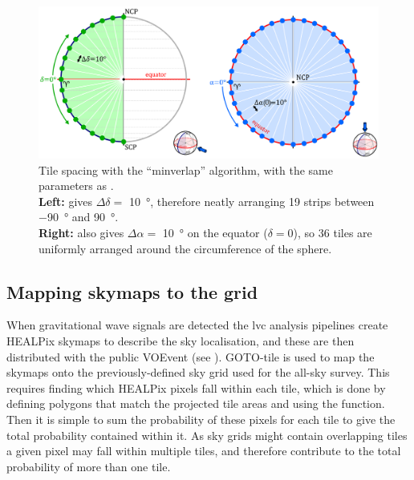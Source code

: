 \begin{colsection}
\begin{colsection}
\begin{figure}[p]
    \begin{center}
        \includegraphics[width=\linewidth]{images/spacing_minverlap.pdf}
    \end{center}
    \caption[Tile spacing with the ``minverlap'' algorithm]{
        Tile spacing with the ``minverlap'' algorithm, with the same parameters as .
        \\
        \textbf{Left:}  gives $\Delta\delta = $ \SI{10}{\degree}, therefore neatly arranging 19 strips    between \SI{-90}{\degree} and \SI{90}{\degree}.
        \\
        \textbf{Right:}  also gives $\Delta\alpha = $ \SI{10}{\degree} on the equator ($\delta=0$), so 36 tiles are uniformly arranged around the circumference of the sphere.
    }\label{fig:minverlap_spacing}
\end{figure}

\clearpage

\end{colsection}


\subsection{Mapping skymaps to the grid}
\label{sec:mapping_skymaps}
\begin{colsection}

When gravitational wave signals are detected the \gls{lvc} analysis pipelines create HEALPix skymaps to describe the sky localisation, and these are then distributed with the public VOEvent (see ). GOTO-tile is used to map the skymaps onto the previously-defined sky grid used for the all-sky survey. This requires finding which HEALPix pixels fall within each tile, which is done by defining polygons that match the projected tile areas and using the   function. Then it is simple to sum the probability of these pixels for each tile to give the total probability contained within it. As sky grids might contain overlapping tiles a given pixel may fall within multiple tiles, and therefore contribute to the total probability of more than one tile.


\end{colsection}
\end{colsection}
